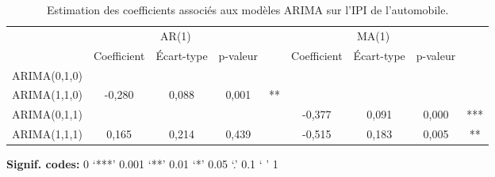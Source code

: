 \documentclass[french]{article}
\begin{document}
\begin{table}[!h]

\caption{\label{tab:tabcoefs}Estimation des coefficients associés aux modèles ARIMA sur l'IPI de l'automobile.}
\centering
\begin{threeparttable}
\begin{tabular}[t]{lcccccccc}
\toprule
\multicolumn{1}{c}{ } & \multicolumn{3}{c}{AR(1)} & \multicolumn{1}{c}{ } & \multicolumn{3}{c}{MA(1)} & \multicolumn{1}{c}{ } \\
\cmidrule(l{3pt}r{3pt}){2-4} \cmidrule(l{3pt}r{3pt}){6-8}
  & Coefficient & Écart-type & p-valeur &  & Coefficient & Écart-type & p-valeur & \\
\midrule
ARIMA(0,1,0) &  &  &  &  &  &  &  & \\
ARIMA(1,1,0) & -0,280 & 0,088 & 0,001 & ** &  &  &  & \\
ARIMA(0,1,1) &  &  &  &  & -0,377 & 0,091 & 0,000 & ***\\
ARIMA(1,1,1) & 0,165 & 0,214 & 0,439 &  & -0,515 & 0,183 & 0,005 & **\\
\bottomrule
\end{tabular}
\begin{tablenotes}
\item \hspace{-0.4cm}\textbf{Signif. codes: }0 `***' 0.001 `**' 0.01 `*' 0.05 `.' 0.1 ` ' 1
\end{tablenotes}
\end{threeparttable}
\end{table}
\end{document}
